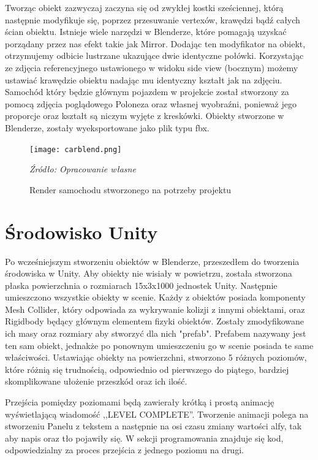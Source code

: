 \indent Tworząc obiekt zazwyczaj zaczyna się od zwykłej kostki sześciennej, którą następnie modyfikuje się, poprzez przesuwanie vertexów, krawędzi bądź całych ścian obiektu. Istnieje wiele narzędzi w Blenderze, które pomagają uzyskać porządany przez nas efekt takie jak Mirror. Dodając ten modyfikator na obiekt, otrzymujemy odbicie lustrzane ukazujące dwie identyczne połówki. Korzystając ze zdjęcia referencyjnego ustawionego w widoku side view (bocznym) możemy ustawiać krawędzie obiektu nadając mu identyczny kształt jak na zdjęciu. Samochód który będzie głównym pojazdem w projekcie został stworzony za pomocą zdjęcia poglądowego Poloneza oraz własnej wyobraźni, ponieważ jego proporcje oraz kształt są niczym wyjęte z kreskówki. Obiekty stworzone w Blenderze, zostały wyeksportowane jako plik typu fbx.

\begin{figure}[!hbt]
\centering
  \texttt{[image: carblend.png]}
  \caption{Render samochodu stworzonego na potrzeby projektu}\label{rys_2}
  \begin{minipage}[t]{0.75\linewidth}
    \emph{Źródło: Opracowanie własne}
  \end{minipage}
\end{figure}

\newpage
\section{Środowisko Unity}
\indent Po wcześniejszym stworzeniu obiektów w Blenderze, przeszedłem do tworzenia środowiska w Unity. Aby obiekty nie wisiały w powietrzu, została stworzona płaska powierzchnia o rozmiarach 15x3x1000 jednostek Unity. Następnie umieszczono wszystkie obiekty w scenie. Każdy z obiektów posiada komponenty Mesh Collider, który odpowiada za wykrywanie kolizji z innymi obiektami, oraz Rigidbody będący głównym elementem fizyki obiektów.  Zostały zmodyfikowane ich masy oraz rozmiary aby stworzyć dla nich "prefab". Prefabem nazywany jest ten sam obiekt, jednakże po ponownym umieszczeniu go w scenie posiada te same właściwości. Ustawiając obiekty na powierzchni, stworzono 5 różnych poziomów, które różnią się trudnością, odpowiednio od pierwszego do piątego, bardziej skomplikowane ułożenie przeszkód oraz ich ilość. 

\indent Przejścia pomiędzy poziomami będą zawierały krótką i prostą animację wyświetlającą wiadomość ,,LEVEL COMPLETE''. Tworzenie animacji polega na stworzeniu Panelu z tekstem a następnie na osi czasu zmiany wartości alfy, tak aby napis oraz tło pojawiły się. W sekcji programowania znajduje się kod, odpowiedzialny za proces przejścia z jednego poziomu na drugi. 

